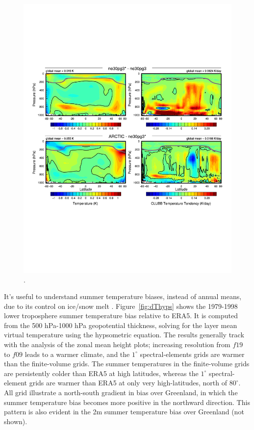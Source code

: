 \documentclass[draft]{agujournal2019}
\begin{document}
\begin{figure}[t]
\begin{center}
         \includegraphics[width=130mm]{figs/temp_dhgt_panel_STEND_CLUBB-hires.pdf}
\end{center}
\caption{.}
\label{fig:dT-hires}
\end{figure}

It's useful to understand summer temperature biases, instead of annual means, due to its control on ice/snow melt \cite{O2001JAM,HT2008Paleo}. Figure~\ref{fig:dThyps} shows the 1979-1998 lower troposphere summer temperature bias relative to ERA5. It is computed from the 500 hPa-1000 hPa geopotential thickness, solving for the layer mean virtual temperature using the hypsometric equation. The results generally track with the analysis of the zonal mean height plots; increasing resolution from $f19$ to $f09$ leads to a warmer climate, and the $1^{\circ}$ spectral-elements grids are warmer than the finite-volume grids. The summer temperatures in the finite-volume grids are persistently colder than ERA5 at high latitudes, whereas the $1^{\circ}$ spectral-element grids are warmer than ERA5 at only very high-latitudes, north of $80^{\circ}$. All grid illustrate a north-south gradient in bias over Greenland, in which the summer temperature bias becomes more positive in the northward direction. This pattern is also evident in the 2m summer temperature bias over Greenland (not shown).
\end{document}
